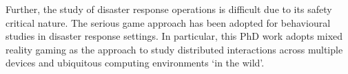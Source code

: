 Further, the study of disaster response operations is difficult due to its safety critical nature. The serious game approach has been adopted for behavioural studies in disaster response settings. In particular, this PhD work adopts mixed reality gaming as the  approach to study distributed interactions across multiple devices and ubiquitous computing environments `in the wild'. \\


